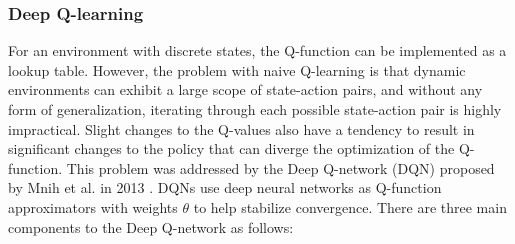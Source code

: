 \documentclass[10pt,journal,compsoc]{IEEEtran}
\begin{document}
\subsubsection{Deep Q-learning}
For an environment with discrete states, the Q-function can be implemented as a lookup table. However, the problem with naive Q-learning is that dynamic environments can exhibit a large scope of state-action pairs, and without any form of generalization, iterating through each possible state-action pair is highly impractical. Slight changes to the Q-values also have a tendency to result in significant changes to the policy that can diverge the optimization of the Q-function. This problem was addressed by the Deep Q-network (DQN) proposed by Mnih et al. in 2013 \cite{deepqlearning}. DQNs use deep neural networks as Q-function approximators with weights \(\theta\) to help stabilize convergence.
There are three main components to the Deep Q-network as follows:
\end{document}
